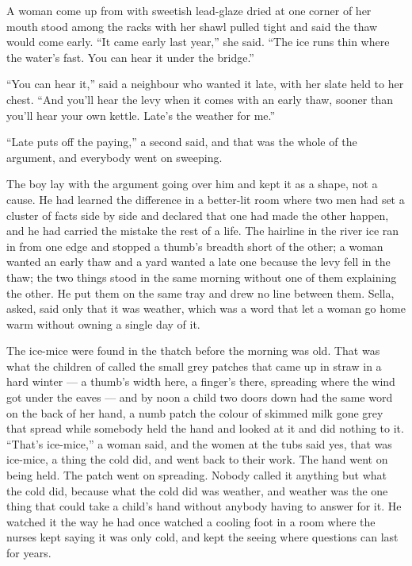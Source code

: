 A woman come up from  with sweetish lead-glaze dried at one corner of her mouth stood among the racks with her shawl pulled tight and said the thaw would come early. “It came early last year,” she said. “The ice runs thin where the water's fast. You can hear it under the bridge.”

“You can hear it,” said a neighbour who wanted it late, with her slate held to her chest. “And you'll hear the levy when it comes with an early thaw, sooner than you'll hear your own kettle. Late's the weather for me.”

“Late puts off the paying,” a second said, and that was the whole of the argument, and everybody went on sweeping.

The boy lay with the argument going over him and kept it as a shape, not a cause. He had learned the difference in a better-lit room where two men had set a cluster of facts side by side and declared that one had made the other happen, and he had carried the mistake the rest of a life. The hairline in the river ice ran in from one edge and stopped a thumb's breadth short of the other; a woman wanted an early thaw and a yard wanted a late one because the levy fell in the thaw; the two things stood in the same morning without one of them explaining the other. He put them on the same tray and drew no line between them. Sella, asked, said only that it was weather, which was a word that let a woman go home warm without owning a single day of it.

The ice-mice were found in the thatch before the morning was old. That was what the children of  called the small grey patches that came up in straw in a hard winter --- a thumb's width here, a finger's there, spreading where the wind got under the eaves --- and by noon a child two doors down had the same word on the back of her hand, a numb patch the colour of skimmed milk gone grey that spread while somebody held the hand and looked at it and did nothing to it. “That's ice-mice,” a woman said, and the women at the tubs said yes, that was ice-mice, a thing the cold did, and went back to their work. The hand went on being held. The patch went on spreading. Nobody called it anything but what the cold did, because what the cold did was weather, and weather was the one thing that could take a child's hand without anybody having to answer for it. He watched it the way he had once watched a cooling foot in a room where the nurses kept saying it was only cold, and kept the seeing where questions can last for years.

